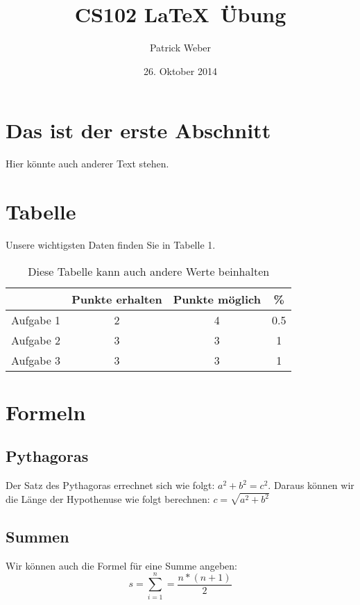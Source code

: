 \documentclass[11pt,a4paper]{article}
\date{26. Oktober 2014}
\author{Patrick Weber}
\title{CS102 \LaTeX \ \"Ubung}
\begin{document}
\maketitle

\section{Das ist der erste Abschnitt}
Hier k\"onnte auch anderer Text stehen.

\section{Tabelle}
Unsere wichtigsten Daten finden Sie in Tabelle 1.

\begin{table}[h]
\centering
\begin{tabular}{c|c|c|c}
& Punkte erhalten & Punkte m\"oglich & \% \\
\hline
Aufgabe 1 & 2 & 4 & 0.5 \\
Aufgabe 2 & 3 & 3 & 1 \\
Aufgabe 3 & 3 & 3 & 1 \\
\end{tabular}
\caption{Diese Tabelle kann auch andere Werte beinhalten}
\end{table}

\section{Formeln}
\subsection{Pythagoras}
Der Satz des Pythagoras errechnet sich wie folgt: $a^2+b^2=c^2$. Daraus k\"onnen wir die L\"ange der Hypothenuse wie folgt berechnen: $c=\sqrt{a^2+b^2}$
\subsection{Summen}
Wir k\"onnen auch die Formel f\"ur eine Summe angeben:
\begin{equation}
s=\sum\limits_{i=1}^{n}=\frac{n*(n+1)}{2}
\end{equation}
\end{document}
